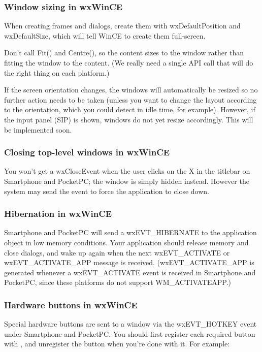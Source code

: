 \subsubsection{Window sizing in wxWinCE}

When creating frames and dialogs, create them with wxDefaultPosition and
wxDefaultSize, which will tell WinCE to create them full-screen.

Don't call Fit() and Centre(), so the content sizes to
the window rather than fitting the window to the content. (We really need a single API call
that will do the right thing on each platform.)

If the screen orientation changes, the windows will automatically be resized
so no further action needs to be taken (unless you want to change the layout
according to the orientation, which you could detect in idle time, for example).
However, if the input panel (SIP) is shown, windows do not yet resize accordingly. This will
be implemented soon.

\subsubsection{Closing top-level windows in wxWinCE}

You won't get a wxCloseEvent when the user clicks on the X in the titlebar
on Smartphone and PocketPC; the window is simply hidden instead. However the system may send the
event to force the application to close down.

\subsubsection{Hibernation in wxWinCE}

Smartphone and PocketPC will send a wxEVT\_HIBERNATE to the application object in low
memory conditions. Your application should release memory and close dialogs,
and wake up again when the next wxEVT\_ACTIVATE or wxEVT\_ACTIVATE\_APP message is received.
(wxEVT\_ACTIVATE\_APP is generated whenever a wxEVT\_ACTIVATE event is received
in Smartphone and PocketPC, since these platforms do not support WM\_ACTIVATEAPP.)

\subsubsection{Hardware buttons in wxWinCE}

Special hardware buttons are sent to a window via the wxEVT\_HOTKEY event
under Smartphone and PocketPC. You should first register each required button with ,
and unregister the button when you're done with it. For example:

